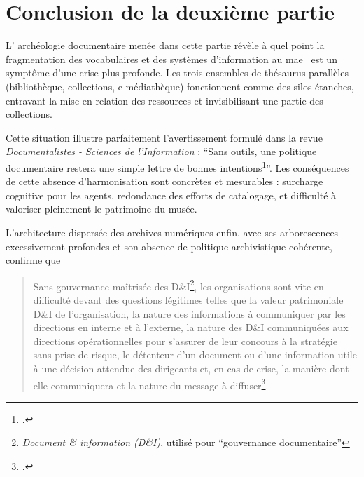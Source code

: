 \documentclass[12pt,twoside]{book}
\newcommand{\mae}{\ac{mae}}
\begin{document}
	
	
	
	
	
	\bigskip
	\section*{Conclusion de la deuxième partie}
	
	\lettrine{L}{'} archéologie documentaire menée dans cette partie révèle à quel point la fragmentation des vocabulaires et des systèmes d'information au \mae~ est un symptôme d'une crise plus profonde. Les trois ensembles de thésaurus parallèles (bibliothèque, collections, e-médiathèque) fonctionnent comme des silos étanches, entravant la mise en relation des ressources et invisibilisant une partie des collections.
	
	Cette situation illustre parfaitement l'avertissement formulé dans la revue \textit{Documentalistes - Sciences de l'Information} : \enquote{Sans outils, une politique documentaire restera une simple lettre de bonnes intentions\footcite[p. 50-59]{GouvernanceLinformationPerspectives2013}}. Les conséquences de cette absence d'harmonisation sont concrètes et mesurables : surcharge cognitive pour les agents, redondance des efforts de catalogage, et difficulté à valoriser pleinement le patrimoine du musée.
		
	L'architecture dispersée des archives numériques enfin, avec ses arborescences excessivement profondes et son absence de politique archivistique cohérente, confirme que 
	\begin{quote}
		\og Sans gouvernance maîtrisée des D\&I\footnote{\textit{Document \& information (D\&I)}, utilisé pour \enquote{gouvernance documentaire}}, les organisations sont vite en difficulté devant des questions légitimes telles que la valeur patrimoniale D\&I de l’organisation, la nature des informations à communiquer par les directions en interne et à l’externe, la nature des D\&I communiquées aux directions opérationnelles pour s’assurer de leur concours à la stratégie sans prise de risque, le détenteur d’un document ou d’une information utile à une décision attendue des dirigeants et, en cas de crise, la manière dont elle communiquera et la nature du message à diffuser\footcite[p.59]{GouvernanceLinformation2013}.\fg
	\end{quote}
	
\end{document}
